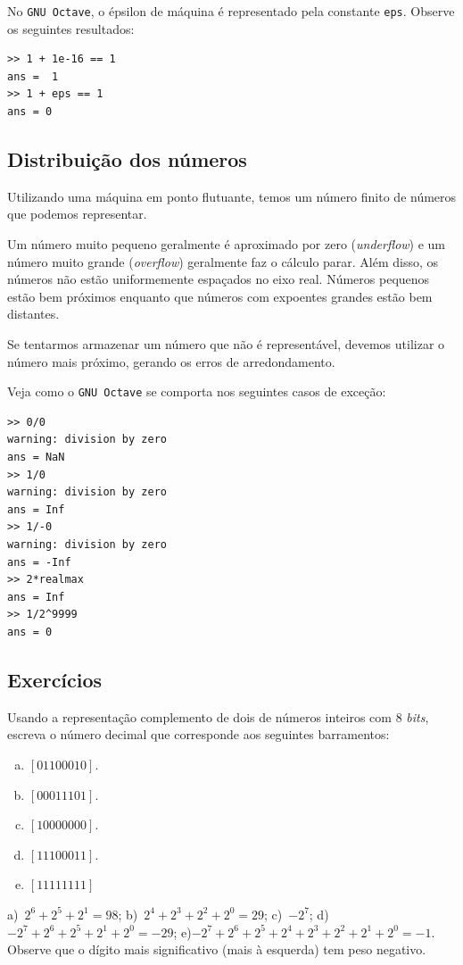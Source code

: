 \begin{obs}
  No \verb+GNU Octave+, o épsilon de máquina é representado pela constante \verb+eps+. Observe os seguintes resultados:
\begin{verbatim}
>> 1 + 1e-16 == 1
ans =  1
>> 1 + eps == 1
ans = 0
\end{verbatim}
\end{obs}


\subsection{Distribuição dos números}
Utilizando uma máquina em ponto flutuante, temos um número finito de números que podemos representar.

Um número muito pequeno geralmente é aproximado por zero (\emph{underflow}) e um número muito grande (\emph{overflow}) geralmente faz o cálculo parar. Além disso, os números não estão uniformemente espaçados no eixo real. Números pequenos estão bem próximos enquanto que números com expoentes grandes estão bem distantes.

Se tentarmos armazenar um número que não é representável, devemos utilizar o número mais próximo, gerando os erros de arredondamento.


\begin{obs}
  Veja como o \verb+GNU Octave+ se comporta nos seguintes casos de exceção:
\begin{verbatim}
>> 0/0
warning: division by zero
ans = NaN
>> 1/0
warning: division by zero
ans = Inf
>> 1/-0
warning: division by zero
ans = -Inf
>> 2*realmax
ans = Inf
>> 1/2^9999
ans = 0
\end{verbatim}
\end{obs}


\subsection*{Exercícios}

\begin{exer}
  Usando a representação complemento de dois de números inteiros com $8$ \emph{bits}, escreva o número decimal que corresponde aos seguintes barramentos:
  \begin{enumerate}[a)]
  \item $[01100010]$.
  \item $[00011101]$.
  \item $[10000000]$.
  \item $[11100011]$.
  \item $[11111111]$
   \end{enumerate}
\end{exer}
\begin{resp}
  a)~$2^6+2^5+2^1=98$; b)~$2^4+2^3+2^2+2^0=29$; c)~$-2^7$; d)~$-2^7+2^6+2^5+2^1+2^0=-29$; e)$-2^7+2^6+2^5+2^4+2^3+2^2+2^1+2^0=-1$.
  Observe que o dígito mais significativo (mais à esquerda) tem peso negativo.
\end{resp}

